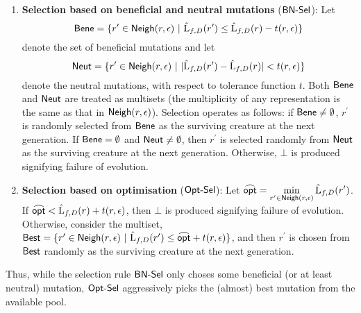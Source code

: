 \begin{enumerate}
\item {\bf Selection based on beneficial and neutral mutations} ($\mathsf{BN\mbox{-}Sel}$): Let 
%
\[ \mathsf{Bene} = \{r^\prime \in \mathsf{Neigh}(r, \epsilon) ~|~ \hat{\mathrm{L}}_{f, D}(r^\prime) \leq
\hat{\mathrm{L}}_{f, D}(r) - t(r, \epsilon) \} \]  
%
denote the set of beneficial mutations and let 
%
\[ \mathsf{Neut} = \{r^\prime \in \mathsf{Neigh}(r, \epsilon) ~|~ |\hat{\mathrm{L}}_{f, D}(r^\prime) -
\hat{\mathrm{L}}_{f, D}(r)| <  t(r, \epsilon) \} \]
%
denote the neutral mutations, with respect to tolerance function $t$. Both
$\mathsf{Bene}$ and $\mathsf{Neut}$ are treated as multisets (the multiplicity of any
representation is the same as that in $\mathsf{Neigh}(r, \epsilon)$). Selection
operates as follows: if $\mathsf{Bene} \neq \emptyset$, $r^\prime$ is randomly selected
from $\mathsf{Bene}$ as the surviving creature at the next generation.  If $\mathsf{Bene} =
\emptyset$ and $\mathsf{Neut} \neq\emptyset$, then $r^\prime$ is selected randomly from
$\mathsf{Neut}$ as the surviving creature at the next generation.  Otherwise, $\bot$ is
produced signifying failure of evolution.
%
\item {\bf Selection based on optimisation} ($\mathsf{Opt\mbox{-}Sel}$): Let $\widehat{\mathsf{opt}} =
\displaystyle\min_{r^\prime \in \mathsf{Neigh}(r, \epsilon)} \hat{\mathrm{L}}_{f,
D}(r^\prime)$.  If $\widehat{\mathsf{opt}} < \hat{\mathrm{L}}_{f, D}(r) + t(r, \epsilon)$,
then $\bot$ is produced signifying failure of evolution.  Otherwise, consider
the multiset, $\mathsf{Best} = \{ r^\prime \in \mathsf{Neigh}(r, \epsilon) ~|~ \hat{\mathrm{L}}_{f,
D}(r^\prime) \leq \widehat{\mathsf{opt}} + t(r, \epsilon) \}$, and then $r^\prime$ is
chosen from $\mathsf{Best}$ randomly as the surviving creature at the next generation.
\end{enumerate}

\noindent Thus, while the selection rule $\mathsf{BN\mbox{-}Sel}$ only choses some beneficial
(or at least neutral) mutation, $\mathsf{Opt\mbox{-}Sel}$ aggressively picks the (almost) best
mutation from the available pool. \medskip

